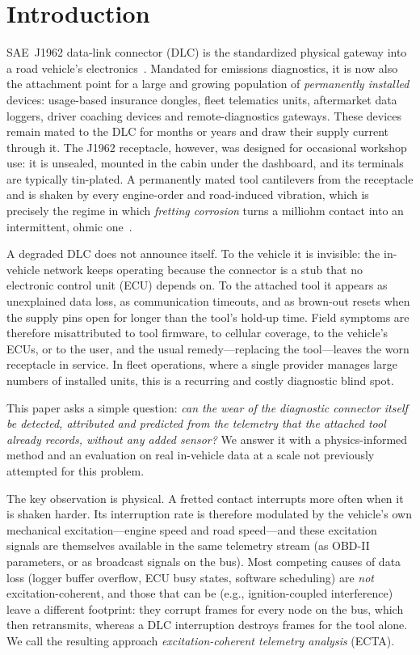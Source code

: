 \section{Introduction}
\label{sec:intro}

 SAE~J1962 data-link connector (DLC) is the standardized
physical gateway into a road vehicle's electronics~\cite{j1962}. Mandated for
emissions diagnostics, it is now also the attachment point for a large and
growing population of \emph{permanently installed} devices: usage-based
insurance dongles, fleet telematics units, aftermarket data loggers, driver
coaching devices and remote-diagnostics gateways. These devices remain mated
to the DLC for months or years and draw their supply current through it. The
J1962 receptacle, however, was designed for occasional workshop use: it is
unsealed, mounted in the cabin under the dashboard, and its terminals are
typically tin-plated. A permanently mated tool cantilevers from the
receptacle and is shaken by every engine-order and road-induced vibration,
which is precisely the regime in which \emph{fretting corrosion} turns a
milliohm contact into an intermittent, ohmic one~\cite{antler1985,bryant1994,
park2008,braunovic}.

A degraded DLC does not announce itself. To the vehicle it is invisible:
the in-vehicle network keeps operating because the connector is a stub that
no electronic control unit (ECU) depends on. To the attached tool it appears
as unexplained data loss, as communication timeouts, and as brown-out resets
when the supply pins open for longer than the tool's hold-up time. Field
symptoms are therefore misattributed to tool firmware, to cellular coverage,
to the vehicle's ECUs, or to the user, and the usual remedy---replacing the
tool---leaves the worn receptacle in service. In fleet operations, where a
single provider manages large numbers of installed units, this is a
recurring and costly diagnostic blind spot.

This paper asks a simple question: \emph{can the wear of the diagnostic
connector itself be detected, attributed and predicted from the telemetry
that the attached tool already records, without any added sensor?} We
answer it with a physics-informed method and an evaluation on real
in-vehicle data at a scale not previously attempted for this problem.

The key observation is physical. A fretted contact interrupts more often
when it is shaken harder. Its interruption rate is therefore modulated by
the vehicle's own mechanical excitation---engine speed and road speed---and
these excitation signals are themselves available in the same telemetry
stream (as OBD-II parameters, or as broadcast signals on the bus). Most
competing causes of data loss (logger buffer overflow, ECU busy states,
software scheduling) are \emph{not} excitation-coherent, and those that can
be (e.g., ignition-coupled interference) leave a different footprint: they
corrupt frames for every node on the bus, which then retransmits, whereas a
DLC interruption destroys frames for the tool alone. We call the resulting
approach \emph{excitation-coherent telemetry analysis} (ECTA).

